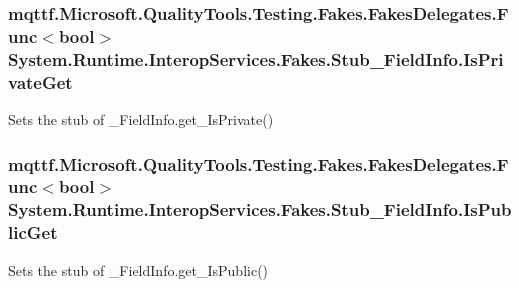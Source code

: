 \hypertarget{class_system_1_1_runtime_1_1_interop_services_1_1_fakes_1_1_stub___field_info_aba599c34b199114873c112c14048c810}{
\subsubsection[{Is\-Private\-Get}]{\setlength{\rightskip}{0pt plus 5cm}mqttf.\-Microsoft.\-Quality\-Tools.\-Testing.\-Fakes.\-Fakes\-Delegates.\-Func$<$bool$>$ System.\-Runtime.\-Interop\-Services.\-Fakes.\-Stub\-\_\-\-Field\-Info.\-Is\-Private\-Get}}\label{class_system_1_1_runtime_1_1_interop_services_1_1_fakes_1_1_stub___field_info_aba599c34b199114873c112c14048c810}


Sets the stub of \-\_\-\-Field\-Info.\-get\-\_\-\-Is\-Private()

\hypertarget{class_system_1_1_runtime_1_1_interop_services_1_1_fakes_1_1_stub___field_info_a38c11e9573e94fad141b0cbd228e370f}{
\subsubsection[{Is\-Public\-Get}]{\setlength{\rightskip}{0pt plus 5cm}mqttf.\-Microsoft.\-Quality\-Tools.\-Testing.\-Fakes.\-Fakes\-Delegates.\-Func$<$bool$>$ System.\-Runtime.\-Interop\-Services.\-Fakes.\-Stub\-\_\-\-Field\-Info.\-Is\-Public\-Get}}\label{class_system_1_1_runtime_1_1_interop_services_1_1_fakes_1_1_stub___field_info_a38c11e9573e94fad141b0cbd228e370f}


Sets the stub of \-\_\-\-Field\-Info.\-get\-\_\-\-Is\-Public()

